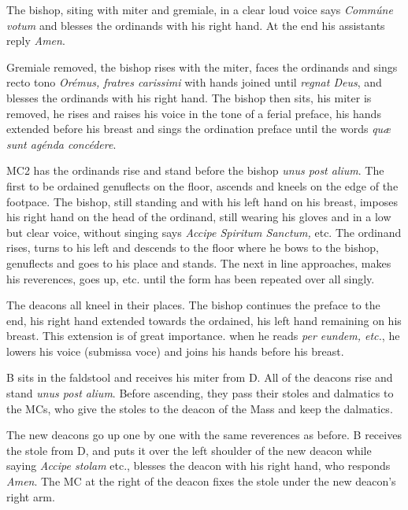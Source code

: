 \documentclass[letterpaper]{report}
\begin{document}
{    \rubric The bishop, siting with miter and gremiale, in a clear loud voice
    says \textit{Commúne votum} and blesses the ordinands with his right hand.
    At the end his assistants reply \textit{Amen}. 

    \rubric Gremiale removed, the bishop rises with the miter, faces the
    ordinands and sings recto tono \textit{Orémus, fratres carissimi} with
    hands joined until \textit{regnat Deus}, and blesses the ordinands with his
    right hand. The bishop then sits, his miter is removed, he rises and raises
    his voice in the tone of a ferial preface, his hands extended before his
    breast and sings the ordination preface until the words \textit{quæ sunt
    agénda concédere}. 

    \rubric MC2 has the ordinands rise and stand before the bishop \textit{unus
    post alium}. The first to be ordained genuflects on the floor, ascends and
    kneels on the edge of the footpace. The bishop, still standing and with his
    left hand on his breast, imposes his right hand on the head of the
    ordinand, still wearing his gloves and in a low but clear voice, without
    singing says \textit{Accipe Spiritum Sanctum,} etc. The ordinand rises,
    turns to his left and descends to the floor where he bows to the bishop,
    genuflects and goes to his place and stands. The next in line approaches,
    makes his reverences, goes up, etc. until the form has been repeated over
    all singly.

    \rubric The deacons all kneel in their places. The bishop continues the
    preface to the end, his right hand extended towards the ordained, his left
    hand remaining on his breast. This extension is of great importance. when
    he reads \textit{per eundem, etc.}, he lowers his voice (submissa voce) and
    joins his hands before his breast. 

    \rubric B sits in the faldstool and receives his miter from D. All of the
    deacons rise and stand \textit{unus post alium}. Before ascending, they
    pass their stoles and dalmatics to the MCs, who give the stoles to the
    deacon of the Mass and keep the dalmatics. 

    \rubric The new deacons go up one by one with the same reverences as
    before. B receives the stole from D, and puts it over the left shoulder of
    the new deacon while saying \textit{Accipe stolam} etc., blesses the deacon
    with his right hand, who responds \textit{Amen}. The MC at the right of the
    deacon fixes the stole under the new deacon's right arm.

}
\end{document}
